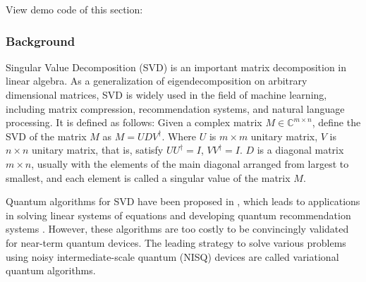 View demo code of this section: 

\subsubsection{Background}
Singular Value Decomposition (SVD) is an important matrix decomposition in linear algebra. As a generalization of eigendecomposition on arbitrary dimensional matrices, SVD is widely used in the field of machine learning, including matrix compression, recommendation systems, and natural language processing. It is defined as follows:
Given a complex matrix $M \in \mathbb{C}^{m \times n}$, define the SVD of the matrix $M$ as $M = UDV^\dagger$. Where $U$ is $m \times m$ unitary matrix, $V$ is $n \times n$ unitary matrix, that is, satisfy $UU^\dagger = I$, $VV^\dagger = I$. $D$ is a diagonal matrix $m \times n$, usually with the elements of the main diagonal arranged from largest to smallest, and each element is called a singular value of the matrix $M$.


Quantum algorithms for SVD have been proposed in \cite{kerenidis2016quantum, rebentrost2018quantum}, which leads to applications in solving linear systems of equations \cite{wossnig2018quantum} and developing quantum recommendation systems \cite{kerenidis2016quantum}. However, these algorithms are too costly to be convincingly validated for near-term quantum devices. The leading strategy to solve various problems using noisy intermediate-scale quantum (NISQ) devices are called variational quantum algorithms.

